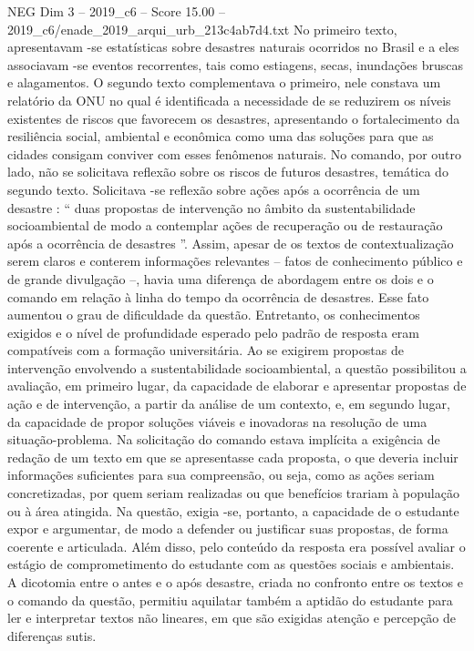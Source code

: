 \begin{textsample}{NEG Dim 3 – 2019\_c6 – Score 15.00 – 2019\_c6/enade\_2019\_arqui\_urb\_213c4ab7d4.txt}
No primeiro texto, apresentavam -se estatísticas sobre desastres naturais ocorridos no Brasil e a eles associavam -se eventos recorrentes, tais como estiagens, secas, inundações bruscas e alagamentos.
O segundo texto complementava o primeiro, nele constava um relatório da ONU no qual é identificada a necessidade de se reduzirem os níveis existentes de riscos que favorecem os desastres, apresentando o fortalecimento da resiliência social, ambiental e econômica como uma das soluções para que as cidades consigam conviver com esses fenômenos naturais.
No comando, por outro lado, não se solicitava reflexão sobre os riscos de futuros desastres, temática do segundo texto.
Solicitava -se reflexão sobre ações após a ocorrência de um desastre : “ duas propostas de intervenção no âmbito da sustentabilidade socioambiental de modo a contemplar ações de recuperação ou de restauração após a ocorrência de desastres ”.
Assim, apesar de os textos de contextualização serem claros e conterem informações relevantes – fatos de conhecimento público e de grande divulgação –, havia uma diferença de abordagem entre os dois e o comando em relação à linha do tempo da ocorrência de desastres.
Esse fato aumentou o grau de dificuldade da questão.
Entretanto, os conhecimentos exigidos e o nível de profundidade esperado pelo padrão de resposta eram compatíveis com a formação universitária.
Ao se exigirem propostas de intervenção envolvendo a sustentabilidade socioambiental, a questão possibilitou a avaliação, em primeiro lugar, da capacidade de elaborar e apresentar propostas de ação e de intervenção, a partir da análise de um contexto, e, em segundo lugar, da capacidade de propor soluções viáveis e inovadoras na resolução de uma situação-problema.
Na solicitação do comando estava implícita a exigência de redação de um texto em que se apresentasse cada proposta, o que deveria incluir informações suficientes para sua compreensão, ou seja, como as ações seriam concretizadas, por quem seriam realizadas ou que benefícios trariam à população ou à área atingida.
Na questão, exigia -se, portanto, a capacidade de o estudante expor e argumentar, de modo a defender ou justificar suas propostas, de forma coerente e articulada.
Além disso, pelo conteúdo da resposta era possível avaliar o estágio de comprometimento do estudante com as questões sociais e ambientais.
A dicotomia entre o antes e o após desastre, criada no confronto entre os textos e o comando da questão, permitiu aquilatar também a aptidão do estudante para ler e interpretar textos não lineares, em que são exigidas atenção e percepção de diferenças sutis.

\end{textsample}
